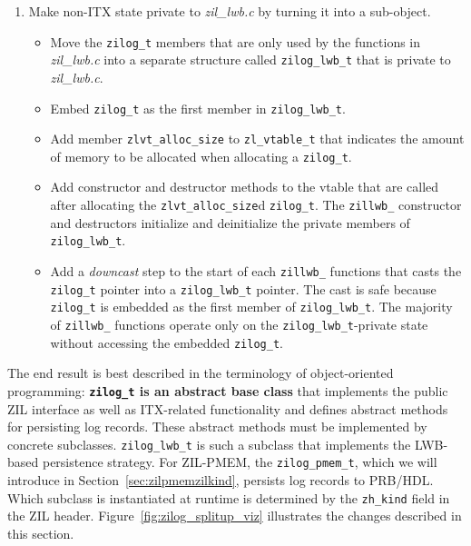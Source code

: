 \documentclass[12pt,a4paper,twoside]{book}
\begin{document}
{\begin{enumerate}[noitemsep]
\begin{itemize}
              \item Define \lstinline{zillwb_vtable} as an instance of \lstinline{zil_vtable_t} that uses \lstinline{zillwb_} functions as values for the respective function pointer members.
              \item Add a member \lstinline{zl_vtable} to \lstinline{zilog_t} that is pointer to a \lstinline{zil_vtable_t}.
              \item Replace all calls to \lstinline{zillwb_FN()} in \textit{zil.c} with indirect calls through the vtable, i.e., \lstinline{zilog->zl_vtable.FN()}.
          \end{itemize}
    \item Make non-ITX state private to \textit{zil\_lwb.c} by turning it into a sub-object.
          \begin{itemize}
              \item Move the \lstinline{zilog_t} members that are only used by the functions in \textit{zil\_lwb.c} into a separate structure called \lstinline{zilog_lwb_t} that is private to \textit{zil\_lwb.c}.
              \item Embed \lstinline{zilog_t} as the first member in \lstinline{zilog_lwb_t}.
              \item Add member \lstinline{zlvt_alloc_size} to \lstinline{zl_vtable_t} that indicates the amount of memory to be allocated when allocating a \lstinline{zilog_t}.
              \item Add constructor and destructor methods to the vtable that are called after allocating the \lstinline{zlvt_alloc_size}d \lstinline{zilog_t}.
                The \lstinline{zillwb_} constructor and destructors initialize and deinitialize the private members of \lstinline{zilog_lwb_t}.
              \item Add a \textit{downcast} step to the start of each \lstinline{zillwb_} functions that casts the \lstinline{zilog_t} pointer into a \lstinline{zilog_lwb_t} pointer.
                The cast is safe because \lstinline{zilog_t} is embedded as the first member of \lstinline{zilog_lwb_t}.
                The majority of \lstinline{zillwb_} functions operate only on the \lstinline{zilog_lwb_t}-private state without accessing the embedded \lstinline{zilog_t}.
          \end{itemize}
\end{enumerate}
The end result is best described in the terminology of object-oriented programming:
\textbf{\lstinline{zilog_t} is an abstract base class} that implements the public ZIL interface as well as ITX-related functionality and defines abstract methods for persisting log records.
These abstract methods must be implemented by concrete subclasses.
\lstinline{zilog_lwb_t} is such a subclass that implements the LWB-based persistence strategy.
For ZIL-PMEM, the \lstinline{zilog_pmem_t}, which we will introduce in Section~\ref{sec:zilpmemzilkind}, persists log records to PRB/HDL.
Which subclass is instantiated at runtime is determined by the \lstinline{zh_kind} field in the ZIL header.
Figure~\ref{fig:zilog_splitup_viz} illustrates the changes described in this section.

}
\end{document}

